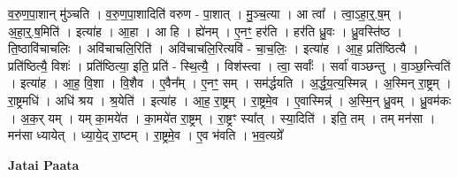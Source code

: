 \documentclass[17pt]{extarticle}
\begin{document}
व॒रु॒ण॒पा॒शान् मु॑ञ्चति । व॒रु॒ण॒पा॒शादिति॑ वरुण - पा॒शात् । मु॒ञ्च॒त्या । आ त्वा᳚ । त्वा॒ऽहा॒र्॒.ष॒म् । अ॒हा॒र्॒.ष॒मिति॑ । इत्या॑ह । आ॒हा । आ हि । ह्ये॑नम् । ए॒नꣳ॒॒ हर॑ति । हर॑ति ध्रु॒वः । ध्रु॒वस्ति॑ष्ठ । ति॒ष्ठावि॑चाचलिः । अवि॑चाचलि॒रिति॑ । अवि॑चाचलि॒रित्यवि॑ - चा॒च॒लिः॒ । इत्या॑ह । आ॒ह॒ प्रति॑ष्ठित्यै । प्रति॑ष्ठित्यै॒ विशः॑ । प्रति॑ष्ठित्या॒ इति॒ प्रति॑ - स्थि॒त्यै॒ । विश॑स्त्वा । त्वा॒ सर्वाः᳚ । सर्वा॑ वाञ्छन्तु । वा॒ञ्छ॒न्त्विति॑ । इत्या॑ह । आ॒ह॒ वि॒शा । वि॒शैव । ए॒वैन᳚म् । ए॒नꣳ॒॒ सम् । सम॑र्द्धयति । अ॒र्द्ध॒य॒त्य॒स्मिन्न् । अ॒स्मिन् रा॒ष्ट्रम् । रा॒ष्ट्रमधि॑ । अधि॑ श्रय । श्र॒येति॑ । इत्या॑ह । आ॒ह॒ रा॒ष्ट्रम् । रा॒ष्ट्रमे॒व । ए॒वास्मिन्न्॑ । अ॒स्मि॒न् ध्रु॒वम् । ध्रु॒वम॑कः । अ॒क॒र् यम् । यम् का॒मये॑त । का॒मये॑त रा॒ष्ट्रम् । रा॒ष्ट्रꣳ स्या᳚त् । स्या॒दिति॑ । इति॒ तम् । तम् मन॑सा । मन॑सा ध्यायेत् । ध्या॒ये॒द् रा॒ष्टम् । रा॒ष्ट्रमे॒व । ए॒व भ॑वति । भ॒व॒त्यग्रे᳚ \newline

\textbf{Jatai Paata} \newline
\end{document}
